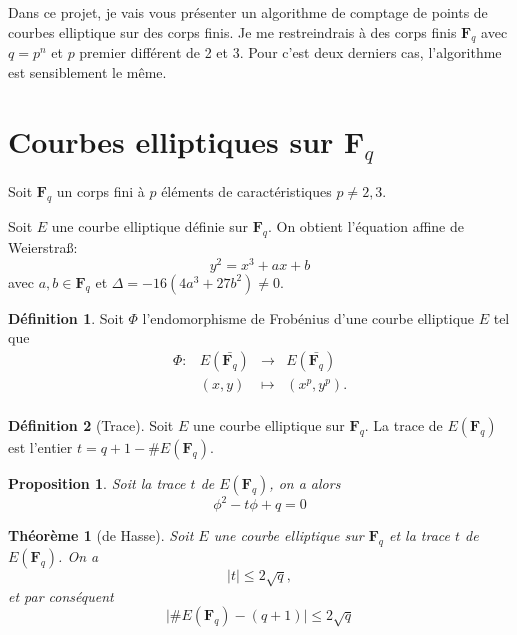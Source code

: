 \documentclass{article}%
\theoremstyle{plain}
\newtheorem{theoreme}{Théorème}[section]
\theoremstyle{definition}
\newtheorem{definition}{Définition}[section]
\theoremstyle{plain}
\newtheorem{proposition}{Proposition}[section]
\theoremstyle{remark}
\newcommand\fq{\mathbf{F}_{q}}
\begin{document}
Dans ce projet, je vais vous présenter un algorithme de comptage de points de courbes elliptique sur des corps finis. Je me restreindrais à des corps finis $\fq$ avec $q=p^{n}$ et $p$ premier différent de 2 et 3. Pour c'est deux derniers cas, l'algorithme est sensiblement le même. 

\section{Courbes elliptiques sur $\fq$}

Soit $\fq$ un corps fini à $p$ éléments de caractéristiques $p\neq 2,3$.

Soit $E$ une courbe elliptique définie sur $\fq$. On obtient l'équation affine de Weierstra\ss : 
\begin{equation}
y^{2} = x^{3} + ax + b
\end{equation} 
avec $a,b\in\fq$ et $\Delta = -16(4a^{3} + 27b^{2}) \neq 0$.

\begin{definition}
Soit $\varPhi$ l'endomorphisme de Frobénius d'une courbe elliptique $E$ tel que  
$$\begin{array}{clcl}
\varPhi : &E(\bar{\fq}) &\longrightarrow &E(\bar{\fq})\\
&(x, y) &\longmapsto	&(x^{p}, y^{p}).\\
\end{array}$$
\end{definition}

\begin{definition}[Trace]
Soit $E$ une courbe elliptique sur $\fq$. La trace de $E(\fq)$ est l'entier $t=q+1-\#E(\fq)$.
\end{definition}

\begin{proposition}
Soit la trace $t$ de $E(\fq)$, on a alors 
\begin{equation}
\phi^{2} - t\phi + q = 0
\end{equation}
\end{proposition}

\begin{theoreme}[de Hasse]
Soit $E$ une courbe elliptique sur $\fq$ et la trace $t$ de $E(\fq)$.
On a \begin{equation}
\mid t\mid\leq 2\sqrt{q},
\end{equation}
et par conséquent
\begin{equation}
\mid\#E(\fq)-(q+1)\mid\leq 2\sqrt{q}
\end{equation}
\end{theoreme}
\end{document}
